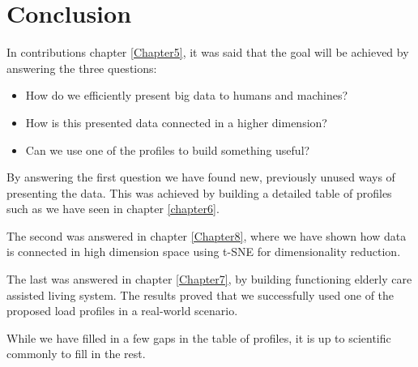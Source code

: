 
\chapter{Conclusion} %

\label{Chapter9} %

In contributions chapter \ref{Chapter5}, it was said that the goal will be achieved by answering the three questions:

\begin{itemize}
	\item How do we efficiently present big data to humans and machines?
	\item How is this presented data connected in a higher dimension?
	\item Can we use one of the profiles to build something useful? 
\end{itemize}

By answering the first question we have found new, previously unused ways of presenting the data.
This was achieved by building a detailed table of profiles such as we have seen in chapter \ref{chapter6}.

The second was answered in chapter \ref{Chapter8}, where we have shown how data is connected in high dimension space
using t-SNE for dimensionality reduction. 

The last was answered in chapter \ref{Chapter7}, by building functioning elderly care assisted living system. 
The results proved that we successfully used one of the proposed load profiles in a real-world scenario. 

While we have filled in a few gaps in the table of profiles, it is up to scientific commonly to fill in the rest. 